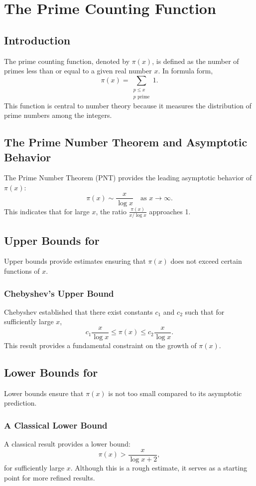 \chapter{The Prime Counting Function}
\label{chap:prime_counting_function}

\section{Introduction}
The prime counting function, denoted by $\pi(x)$, is defined as the number of primes less than or equal to a given real number $x$. In formula form,
\[
\pi(x) = \sum_{\substack{p \le x \\ p \text{ prime}}} 1.
\]
This function is central to number theory because it measures the distribution of prime numbers among the integers.

\section{The Prime Number Theorem and Asymptotic Behavior}
The Prime Number Theorem (PNT) provides the leading asymptotic behavior of $\pi(x)$:
\[
\pi(x) \sim \frac{x}{\log x} \quad \text{as } x \to \infty.
\]
This indicates that for large $x$, the ratio $\frac{\pi(x)}{x/\log x}$ approaches 1.

\section{Upper Bounds for }
Upper bounds provide estimates ensuring that $\pi(x)$ does not exceed certain functions of $x$.

\subsection{Chebyshev's Upper Bound}
Chebyshev established that there exist constants \(c_1\) and \(c_2\) such that for sufficiently large \(x\),
\[
c_1 \frac{x}{\log x} \leq \pi(x) \leq c_2 \frac{x}{\log x}.
\]
This result provides a fundamental constraint on the growth of $\pi(x)$.

\section{Lower Bounds for }
Lower bounds ensure that $\pi(x)$ is not too small compared to its asymptotic prediction.

\subsection{A Classical Lower Bound}
A classical result provides a lower bound:
\[
\pi(x) > \frac{x}{\log x + 2},
\]
for sufficiently large $x$. Although this is a rough estimate, it serves as a starting point for more refined results.

